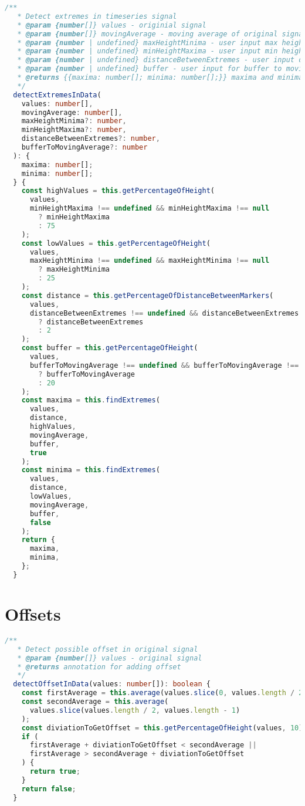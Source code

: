 \begin{lstlisting}[language=Typescript]
 /**
   * Detect extremes in timeseries signal
   * @param {number[]} values - originial signal
   * @param {number[]} movingAverage - moving average of original signal
   * @param {number | undefined} maxHeightMinima - user input max height for minima
   * @param {number | undefined} minHeightMaxima - user input min height for maxima
   * @param {number | undefined} distanceBetweenExtremes - user input distance between extremes
   * @param {number | undefined} buffer - user input for buffer to moving average
   * @returns {{maxima: number[]; minima: number[];}} maxima and minima for extremes
   */
  detectExtremesInData(
    values: number[],
    movingAverage: number[],
    maxHeightMinima?: number,
    minHeightMaxima?: number,
    distanceBetweenExtremes?: number,
    bufferToMovingAverage?: number
  ): {
    maxima: number[];
    minima: number[];
  } {
    const highValues = this.getPercentageOfHeight(
      values,
      minHeightMaxima !== undefined && minHeightMaxima !== null
        ? minHeightMaxima
        : 75
    );
    const lowValues = this.getPercentageOfHeight(
      values,
      maxHeightMinima !== undefined && maxHeightMinima !== null
        ? maxHeightMinima
        : 25
    );
    const distance = this.getPercentageOfDistanceBetweenMarkers(
      values,
      distanceBetweenExtremes !== undefined && distanceBetweenExtremes !== null
        ? distanceBetweenExtremes
        : 2
    );
    const buffer = this.getPercentageOfHeight(
      values,
      bufferToMovingAverage !== undefined && bufferToMovingAverage !== null
        ? bufferToMovingAverage
        : 20
    );
    const maxima = this.findExtremes(
      values,
      distance,
      highValues,
      movingAverage,
      buffer,
      true
    );
    const minima = this.findExtremes(
      values,
      distance,
      lowValues,
      movingAverage,
      buffer,
      false
    );
    return {
      maxima,
      minima,
    };
  }
\end{lstlisting}
\section{Offsets}\label{appendix:trend-detection-code:offsets}
\begin{lstlisting}[language=Typescript]
 /**
   * Detect possible offset in original signal
   * @param {number[]} values - original signal
   * @returns annotation for adding offset
   */
  detectOffsetInData(values: number[]): boolean {
    const firstAverage = this.average(values.slice(0, values.length / 2));
    const secondAverage = this.average(
      values.slice(values.length / 2, values.length - 1)
    );
    const diviationToGetOffset = this.getPercentageOfHeight(values, 10);
    if (
      firstAverage + diviationToGetOffset < secondAverage ||
      firstAverage > secondAverage + diviationToGetOffset
    ) {
      return true;
    }
    return false;
  }
\end{lstlisting}
